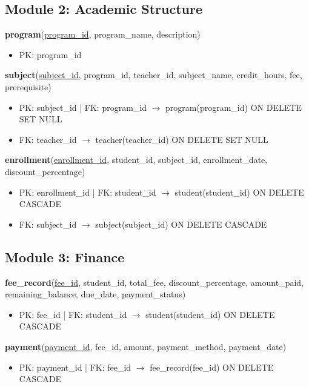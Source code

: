 \documentclass[12pt,a4paper]{report}
\begin{document}
\subsection{Module 2: Academic Structure}

\textbf{program}(\underline{program\_id}, program\_name, description)
\begin{itemize}[noitemsep,topsep=2pt]
    \item PK: program\_id
\end{itemize}

\textbf{subject}(\underline{subject\_id}, program\_id, teacher\_id, subject\_name, credit\_hours, fee, prerequisite)
\begin{itemize}[noitemsep,topsep=2pt]
    \item PK: subject\_id \quad | \quad FK: program\_id $\rightarrow$ program(program\_id) ON DELETE SET NULL
    \item FK: teacher\_id $\rightarrow$ teacher(teacher\_id) ON DELETE SET NULL
\end{itemize}

\textbf{enrollment}(\underline{enrollment\_id}, student\_id, subject\_id, enrollment\_date, discount\_percentage)
\begin{itemize}[noitemsep,topsep=2pt]
    \item PK: enrollment\_id \quad | \quad FK: student\_id $\rightarrow$ student(student\_id) ON DELETE CASCADE
    \item FK: subject\_id $\rightarrow$ subject(subject\_id) ON DELETE CASCADE
\end{itemize}

\subsection{Module 3: Finance}

\textbf{fee\_record}(\underline{fee\_id}, student\_id, total\_fee, discount\_percentage, amount\_paid, remaining\_balance, due\_date, payment\_status)
\begin{itemize}[noitemsep,topsep=2pt]
    \item PK: fee\_id \quad | \quad FK: student\_id $\rightarrow$ student(student\_id) ON DELETE CASCADE
\end{itemize}

\textbf{payment}(\underline{payment\_id}, fee\_id, amount, payment\_method, payment\_date)
\begin{itemize}[noitemsep,topsep=2pt]
    \item PK: payment\_id \quad | \quad FK: fee\_id $\rightarrow$ fee\_record(fee\_id) ON DELETE CASCADE
\end{itemize}
\end{document}
